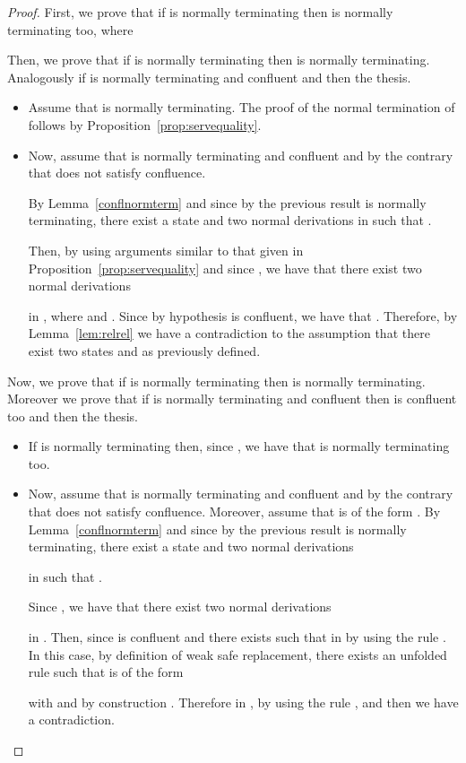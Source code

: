 \documentclass{tlp}
\begin{document}
\begin{proof}
First, we prove that if  is normally terminating then   is normally terminating too, where

   Then, we prove that if  is normally terminating then  is normally terminating.
    Analogously if  is normally terminating and confluent and then the thesis.
\begin{itemize}
   \item Assume that  is normally terminating.
  The proof of the normal termination of  follows by Proposition~\ref{prop:servequality}.

   \item Now, assume that  is normally terminating and confluent and by the contrary that  does not satisfy confluence.


       By Lemma~\ref{conflnormterm} and since by the previous result  is normally terminating, there exist a state
 and two normal derivations
 in 
such that
.


Then, by using arguments similar to that given in Proposition~\ref{prop:servequality} and since , we have that there exist two normal derivations

in , where
  and . Since by hypothesis  is confluent, we have that .
  Therefore, by Lemma~\ref{lem:relrel} we have a contradiction to the assumption that there exist two states  and  as previously defined.
 \end{itemize}


 \noindent Now, we prove that if  is normally terminating then  is normally terminating. Moreover we prove  that if  is normally terminating and confluent then  is confluent too and then the thesis.
 \begin{itemize}
   \item If  is normally terminating then, since , we have that
   is normally terminating too.
     \item Now, assume that  is normally terminating and confluent and  by the contrary that  does not satisfy confluence. Moreover, assume that  is of the form . By Lemma~\ref{conflnormterm} and since by the previous result  is normally terminating, there exist a state
 and two normal derivations

 in  such that
.


Since , we have that there exist two normal derivations

in . Then, since  is confluent and  there exists  such that
 in  by using the rule . In this case, by definition of weak safe replacement, there exists an unfolded rule   such that  is of the form

with  and by construction . Therefore  in , by using the rule , and then we have a contradiction.
 \end{itemize}
\end{proof}
\end{document}
